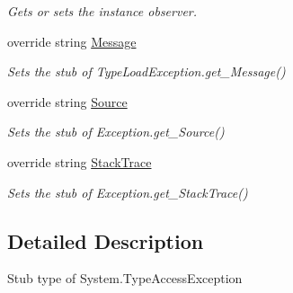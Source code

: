 \begin{DoxyCompactItemize}
\begin{DoxyCompactList}\small\item\em Gets or sets the instance observer.\end{DoxyCompactList}\item 
override string \hyperlink{class_system_1_1_fakes_1_1_stub_type_access_exception_a3a160e3ca71826c1b0404e3ab604e0a9}{Message}
\begin{DoxyCompactList}\small\item\em Sets the stub of Type\-Load\-Exception.\-get\-\_\-\-Message()\end{DoxyCompactList}\item 
override string \hyperlink{class_system_1_1_fakes_1_1_stub_type_access_exception_adc066ac664f7eef130e218607a334d6e}{Source}
\begin{DoxyCompactList}\small\item\em Sets the stub of Exception.\-get\-\_\-\-Source()\end{DoxyCompactList}\item 
override string \hyperlink{class_system_1_1_fakes_1_1_stub_type_access_exception_ad1ba879ac05193c7233f139d0076c201}{Stack\-Trace}
\begin{DoxyCompactList}\small\item\em Sets the stub of Exception.\-get\-\_\-\-Stack\-Trace()\end{DoxyCompactList}\end{DoxyCompactItemize}


\subsection{Detailed Description}
Stub type of System.\-Type\-Access\-Exception



